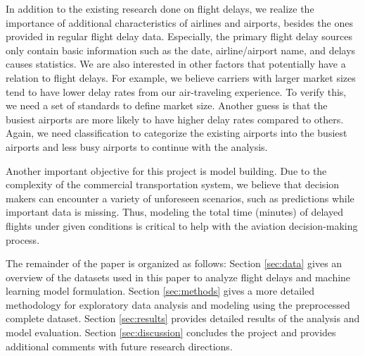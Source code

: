 \documentclass[11pt]{article}
\begin{document}
In addition to the existing research done on flight delays, we realize the importance of additional characteristics of airlines and airports, besides the ones provided in regular flight delay data. Especially, the primary flight delay sources only contain basic information such as the date, airline/airport name, and delays causes statistics. We are also interested in other factors that potentially have a relation to flight delays. For example, we believe carriers with larger market sizes tend to have lower delay rates from our air-traveling experience. To verify this, we need a set of standards to define market size. Another guess is that the busiest airports are more likely to have higher delay rates compared to others. Again, we need classification to categorize the existing airports into the busiest airports and less busy airports to continue with the analysis.

Another important objective for this project is model building. Due to the complexity of the commercial transportation system, we believe that decision makers can encounter a variety of unforeseen scenarios, such as predictions while important data is missing. Thus, modeling the total time (minutes) of delayed flights under given conditions is critical to help with the aviation decision-making process.

The remainder of the paper is organized as follows: Section \ref{sec:data} gives an overview of the datasets used in this paper to analyze flight delays and machine learning model formulation. Section \ref{sec:methods} gives a more detailed methodology for exploratory data analysis and modeling using the preprocessed complete dataset. Section \ref{sec:results} provides detailed results of the analysis and model evaluation. Section \ref{sec:discussion} concludes the project and provides additional comments with future research directions.
\end{document}
